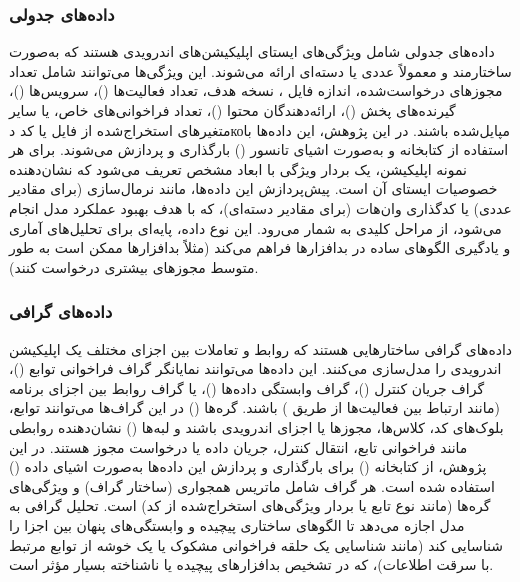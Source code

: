 \subsubsection{داده‌های جدولی}
داده‌های جدولی شامل ویژگی‌های ایستای اپلیکیشن‌های اندرویدی هستند که به‌صورت ساختارمند و معمولاً عددی یا دسته‌ای ارائه می‌شوند. این ویژگی‌ها می‌توانند شامل تعداد مجوزهای درخواست‌شده، اندازه فایل ، نسخه  هدف، تعداد فعالیت‌ها ()، سرویس‌ها ()، گیرنده‌های پخش ()، ارائه‌دهندگان محتوا ()، تعداد فراخوانی‌های  خاص، یا سایر متغیرهای استخراج‌شده از فایل  یا کد دкоمپایل‌شده باشند. در این پژوهش، این داده‌ها با استفاده از کتابخانه  و به‌صورت اشیای تانسور () بارگذاری و پردازش می‌شوند. برای هر نمونه اپلیکیشن، یک بردار ویژگی با ابعاد مشخص تعریف می‌شود که نشان‌دهنده خصوصیات ایستای آن است. پیش‌پردازش این داده‌ها، مانند نرمال‌سازی (برای مقادیر عددی) یا کدگذاری وان‌هات (برای مقادیر دسته‌ای)، که با هدف بهبود عملکرد مدل انجام می‌شود، از مراحل کلیدی به شمار می‌رود. این نوع داده، پایه‌ای برای تحلیل‌های آماری و یادگیری الگوهای ساده در بدافزارها فراهم می‌کند (مثلاً بدافزارها ممکن است به طور متوسط مجوزهای بیشتری درخواست کنند).

\subsubsection{داده‌های گرافی}
داده‌های گرافی ساختارهایی هستند که روابط و تعاملات بین اجزای مختلف یک اپلیکیشن اندرویدی را مدل‌سازی می‌کنند. این داده‌ها می‌توانند نمایانگر گراف فراخوانی توابع ()، گراف جریان کنترل ()، گراف وابستگی داده‌ها ()، یا گراف روابط بین اجزای برنامه (مانند ارتباط بین فعالیت‌ها از طریق ) باشند. گره‌ها () در این گراف‌ها می‌توانند توابع، بلوک‌های کد، کلاس‌ها، مجوزها یا اجزای اندرویدی باشند و لبه‌ها () نشان‌دهنده روابطی مانند فراخوانی تابع، انتقال کنترل، جریان داده یا درخواست مجوز هستند. در این پژوهش، از کتابخانه  () برای بارگذاری و پردازش این داده‌ها به‌صورت اشیای داده () استفاده شده است. هر گراف شامل ماتریس همجواری (ساختار گراف) و ویژگی‌های گره‌ها (مانند نوع تابع یا بردار ویژگی‌های استخراج‌شده از کد) است. تحلیل گرافی به مدل اجازه می‌دهد تا الگوهای ساختاری پیچیده و وابستگی‌های پنهان بین اجزا را شناسایی کند (مانند شناسایی یک حلقه فراخوانی مشکوک یا یک خوشه از توابع مرتبط با سرقت اطلاعات)، که در تشخیص بدافزارهای پیچیده یا ناشناخته بسیار مؤثر است.

